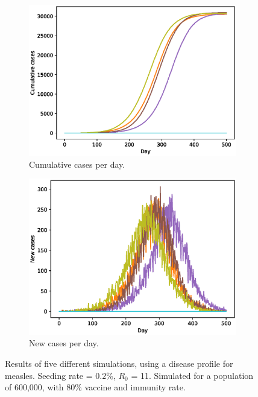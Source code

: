 \documentclass[runningheads]{llncs}
\begin{document}
\begin{figure}[h!]
	\centering
	\begin{subfigure}[b]{0.7\linewidth}
		\includegraphics[width=\linewidth]{cases_cum.eps}
		\caption{Cumulative cases per day.}
	\end{subfigure}
	\begin{subfigure}[b]{0.7\linewidth}
		\includegraphics[width=\linewidth]{cases_per_day.eps}
		\caption{New cases per day.}
	\end{subfigure}
	\caption{Results of five different simulations, using a disease profile for measles. Seeding rate = $0.2$\%, $R_0$ = 11. Simulated for a population of 600,000, with 80\% vaccine and immunity rate.}
	\label{casesPlots}
\end{figure}
\clearpage
\end{document}
